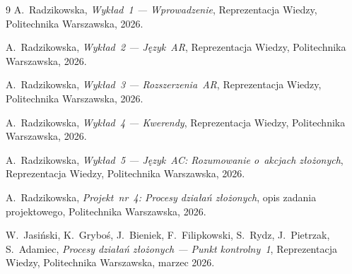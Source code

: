 \begin{thebibliography}{9}
   A.~Radzikowska, \emph{Wykład~1 --- Wprowadzenie},
    Reprezentacja Wiedzy, Politechnika Warszawska, 2026.

   A.~Radzikowska, \emph{Wykład~2 --- Język~AR},
    Reprezentacja Wiedzy, Politechnika Warszawska, 2026.

   A.~Radzikowska, \emph{Wykład~3 --- Rozszerzenia~AR},
    Reprezentacja Wiedzy, Politechnika Warszawska, 2026.

   A.~Radzikowska, \emph{Wykład~4 --- Kwerendy},
    Reprezentacja Wiedzy, Politechnika Warszawska, 2026.

   A.~Radzikowska, \emph{Wykład~5 --- Język~AC:
    Rozumowanie o~akcjach złożonych},
    Reprezentacja Wiedzy, Politechnika Warszawska, 2026.

   A.~Radzikowska, \emph{Projekt~nr~4: Procesy
    działań złożonych}, opis zadania projektowego,
    Politechnika Warszawska, 2026.
    
   W.~Jasiński, K.~Gryboś, J.~Bieniek, F.~Filipkowski,
    S.~Rydz, J.~Pietrzak, S.~Adamiec, \emph{Procesy działań złożonych
    --- Punkt kontrolny~1}, Reprezentacja Wiedzy, Politechnika
    Warszawska, marzec 2026.
\end{thebibliography}
